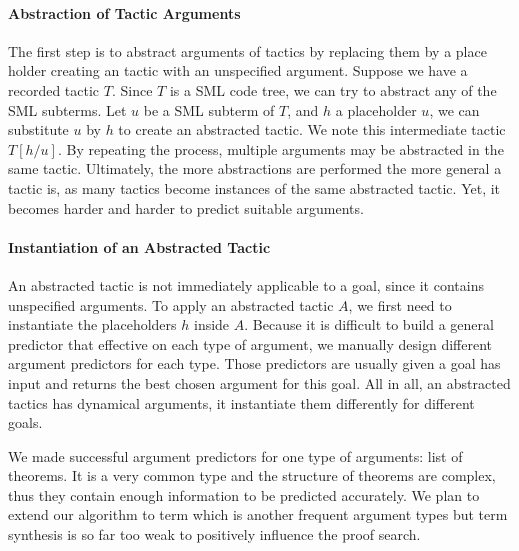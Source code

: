 \documentclass[runningheads,a4paper,draft]{svjour3}
\def\sml{\textsf{SML}\xspace}
\begin{document}
\paragraph{Abstraction of Tactic Arguments}
The first step is to abstract arguments of tactics by replacing them by a 
place holder creating an tactic with an unspecified argument.
Suppose we have a recorded tactic $T$. Since $T$ is a \sml code tree, we can 
try to abstract any of the 
\sml subterms. Let $u$ be a \sml subterm of $T$, and $h$ a placeholder $u$, we 
can substitute $u$ by $h$ to create an abstracted tactic.
We note this intermediate tactic $T[h/u]$. By repeating the process, multiple 
arguments may be abstracted in the same tactic. Ultimately, the more 
abstractions are performed the more general a tactic is, as many tactics 
become instances of the same abstracted tactic. Yet, it becomes harder and 
harder to predict suitable arguments. 

\paragraph{Instantiation of an Abstracted Tactic}
An abstracted tactic is not immediately applicable to a goal, since it contains
unspecified arguments. To apply an abstracted tactic $A$, we first need to 
instantiate the placeholders $h$ inside $A$. Because it is difficult to 
build a general predictor that effective on each type of argument, we manually 
design different argument predictors for each type. Those predictors are 
usually given a goal has input and returns the best chosen argument for this 
goal. All in all, an abstracted tactics has 
dynamical arguments, it instantiate them differently for different goals. 

We made successful argument predictors for one type of arguments: list 
of theorems. It is a very common type and the structure of theorems 
are complex, thus they contain enough information to be predicted accurately. 
We plan to extend our algorithm to term which is another frequent argument 
types but term synthesis is so far too weak to positively 
influence the proof search.
\end{document}
